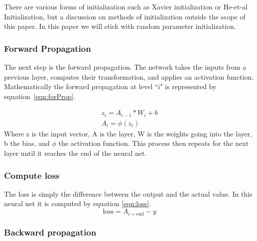 \documentclass[12pt]{article}
\begin{document}
	There are various forms of initialization such as Xavier initialization or He-et-al Initialization, but a discussion on methods of initialization outside the scope of this paper. In this paper we will stick with random parameter initialization. 
	
	

	\subsubsection{Forward Propagation}
	The next step is the forward propagation. The network takes the inputs from a previous layer, computes their transformation, and applies an activation function. Mathematically the forward propagation at level ``i" is represented by equation~\ref{eqn:forProp}.\par  
	\begin{equation}
	\begin{aligned}
	z_i = A_{i-1}* W_{i}+b\\
	A_i=\phi(z_i)
	\end{aligned}
	\label{eqn:forProp}
	\end{equation}
	Where z is the input vector, A is the layer, W is the weights going into the layer, b the bias, and $\phi$ the activation function. This process then repeats for the next layer until it reaches the end of the neural net.
	
	\subsubsection{Compute loss}
	The loss is simply the difference between the output and the actual value. In this neural net it is computed by equation \ref{eqn:loss}.
	\begin{equation}
	\text{loss}=A_{i=\text{end}}-y
	\label{eqn:loss}
	\end{equation}
	\subsubsection{Backward propagation}
	
\end{document}
